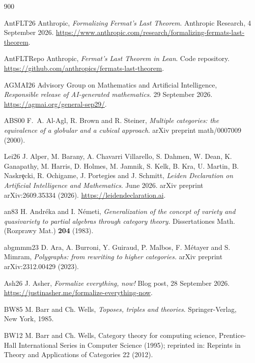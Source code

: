 \begin{thebibliography}{900}


\bibitem%
{AntFLT26} Anthropic, \emph{Formalizing Fermat's Last Theorem}. Anthropic Research, 4 September 2026. \url{https://www.anthropic.com/research/formalizing-fermats-last-theorem}.

\bibitem%
{AntFLTRepo} Anthropic, \emph{Fermat's Last Theorem in Lean}. Code repository. \url{https://github.com/anthropics/fermats-last-theorem}.

\bibitem%
{AGMAI26} Advisory Group on Mathematics and Artificial Intelligence, \emph{Responsible release of AI-generated mathematics}. 29 September 2026. \url{https://agmai.org/general-sep29/}.

\bibitem%
{ABS00}
F.~A. Al-Agl, R. Brown and R. Steiner, \emph{Multiple categories: the equivalence of a globular and a cubical approach}. arXiv preprint math/0007009 (2000).

\bibitem%
{Lei26} J. Alper, M. Barany, A. Chavarri Villarello, S. Dahmen, W. Dean, K. Ganapathy, M. Harris, D. Holmes, M. Jamnik, S. Kelk, B. Kra, U. Martin, B. Naskr\c{e}cki, R. Ochigame, J. Portegies and J. Schmitt, \emph{Leiden Declaration on Artificial Intelligence and Mathematics}. June 2026. arXiv preprint arXiv:2609.35334 (2026). \url{https://leidendeclaration.ai}.

\bibitem%
{an83} H. Andr\'{e}ka and I. N\'{e}meti, \emph{Generalization of the concept of variety and quasivariety to partial algebras through category theory.} Dissertationes Math. (Rozprawy Mat.) \textbf{204} (1983).

\bibitem%
{abgmmm23} D. Ara, A. Burroni, Y. Guiraud, P. Malbos, F. M\'{e}tayer and S. Mimram, \emph{Polygraphs: from rewriting to higher categories.} arXiv preprint arXiv:2312.00429 (2023).

\bibitem%
{Ash26} J. Asher, \emph{Formalize everything, now!} Blog post, 28 September 2026. \url{https://justinasher.me/formalize-everything-now}.

\bibitem%
{BW85} M. Barr and Ch. Wells, \emph{Toposes, triples and theories}. Springer-Verlag, New York, 1985. 

\bibitem%
{BW12} M. Barr and Ch. Wells, Category theory for computing science, Prentice-Hall International Series in Computer Science (1995); reprinted in: Reprints in Theory and Applications of Categories 22 (2012).



\end{thebibliography}
